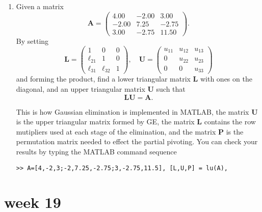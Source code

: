 \documentclass[11pt,a4paper]{article}
\def\bA{\mathbf{A}}
\begin{document}
\begin{enumerate}
\item\label{qdjsx4}
Given a matrix
$$\bA= \left ( \begin{array}{rrr}
         4.00 & -2.00 & 3.00\\
        -2.00 &  7.25 & -2.75 \\
         3.00 & -2.75 & 11.50 \
         \end{array} \right ) . $$
  By setting 
$$  \mathbf{L} =  \left ( \begin{array}{rrr}
         1 & 0 & 0\\
        \ell_{21} &  1 &  0 \\
        \ell_{31} & \ell_{32} & 1
         \end{array} \right ),  \quad
          \mathbf{U} =  \left ( \begin{array}{rrr}
         u_{11} & u_{12} & u_{13} \\
        0  &  u_{22} & u_{23} \\
        0 & 0  & u_{33}    \end{array} \right )
        $$
 and forming the product,
find a lower triangular matrix $ \mathbf{L}$ with ones on the diagonal,
and an upper  triangular matrix $ \mathbf{U}$ such that 
$$  \mathbf{L} \mathbf{U} = \bA.$$

 This is how Gaussian elimination is implemented in MATLAB,
 the matrix $\mathbf{U} $ is the upper triangular matrix formed by GE, the
 matrix $\mathbf{L} $ contains the row mutipliers used at each stage
 of the elimination, and the matrix $\mathbf{P}$  is the permutation 
 matrix   needed  to effect the partial pivoting.
You can check your results by typing the MATLAB command sequence
\begin{verbatim}
>> A=[4,-2,3;-2,7.25,-2.75;3,-2.75,11.5], [L,U,P] = lu(A),
\end{verbatim}



\end{enumerate}

\vfill\eject
\section*{week 19}
\end{document}

